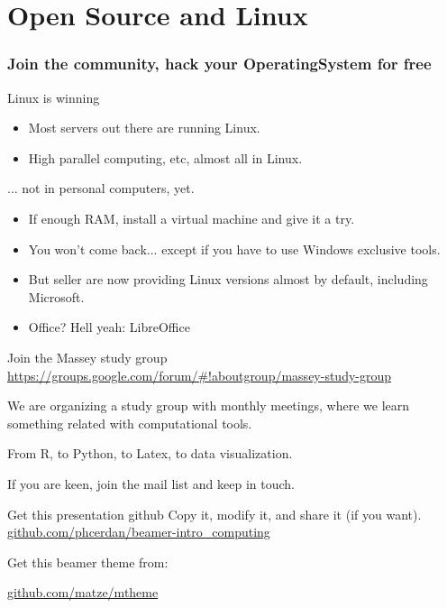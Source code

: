 \documentclass[9pt]{beamer}
\begin{document}
\section{Open Source and Linux}
\begin{frame}
  \frametitle{Join the community, hack your OperatingSystem for free}
  \begin{alertblock}{Linux is winning}
    \begin{itemize}
      \item Most servers out there are running Linux.
      \item High parallel computing, etc, almost all in Linux.
    \end{itemize}
  \end{alertblock}
  \begin{alertblock}{... not in personal computers, yet.}
    \begin{itemize}
      \item If enough RAM, install a virtual machine and give it a try.
      \item You won't come back... except if you have to use Windows exclusive tools.
      \item But seller are now providing Linux versions almost by default, including Microsoft.
      \item Office? Hell yeah: LibreOffice
    \end{itemize}
  \end{alertblock}
\end{frame}

\begin{frame}[fragile]{Join the Massey study group}
  \url{https://groups.google.com/forum/#!aboutgroup/massey-study-group}

  We are organizing a study group with monthly meetings, where we learn something related with computational tools.

  From R, to Python, to Latex, to data visualization.

  If you are keen, join the mail list and keep in touch.

\end{frame}

\begin{frame}{Get this presentation github}
  Copy it, modify it, and share it (if you want). \url{github.com/phcerdan/beamer-intro_computing}

  \vspace{2mm}
  Get this beamer theme from:

  \begin{center}\url{github.com/matze/mtheme}\end{center}

  \begin{center}\ccbysa\end{center}

\end{frame}
%
%
%   
%   
%
\end{document}
